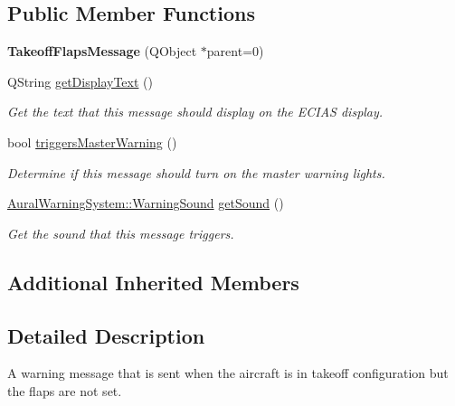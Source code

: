 \subsection*{Public Member Functions}
\begin{DoxyCompactItemize}
\item 
\hypertarget{class_challenger604_systems_1_1_c_a_s_1_1_takeoff_flaps_message_adb686f016825c15c592635eebc34985b}{{\bfseries Takeoff\-Flaps\-Message} (Q\-Object $\ast$parent=0)}\label{class_challenger604_systems_1_1_c_a_s_1_1_takeoff_flaps_message_adb686f016825c15c592635eebc34985b}

\item 
Q\-String \hyperlink{class_challenger604_systems_1_1_c_a_s_1_1_takeoff_flaps_message_a7357021349d02a2d7aba9d3360461761}{get\-Display\-Text} ()
\begin{DoxyCompactList}\small\item\em Get the text that this message should display on the E\-C\-I\-A\-S display. \end{DoxyCompactList}\item 
bool \hyperlink{class_challenger604_systems_1_1_c_a_s_1_1_takeoff_flaps_message_a160c0467f67e17b055683a3bde9dcef3}{triggers\-Master\-Warning} ()
\begin{DoxyCompactList}\small\item\em Determine if this message should turn on the master warning lights. \end{DoxyCompactList}\item 
\hyperlink{class_challenger604_systems_1_1_aural_warning_system_a06a8a8fa973dde5ad449b8e0ca058a26}{Aural\-Warning\-System\-::\-Warning\-Sound} \hyperlink{class_challenger604_systems_1_1_c_a_s_1_1_takeoff_flaps_message_aec477c5edd50ac255f36c750f92622dd}{get\-Sound} ()
\begin{DoxyCompactList}\small\item\em Get the sound that this message triggers. \end{DoxyCompactList}\end{DoxyCompactItemize}
\subsection*{Additional Inherited Members}


\subsection{Detailed Description}
A warning message that is sent when the aircraft is in takeoff configuration but the flaps are not set. 

